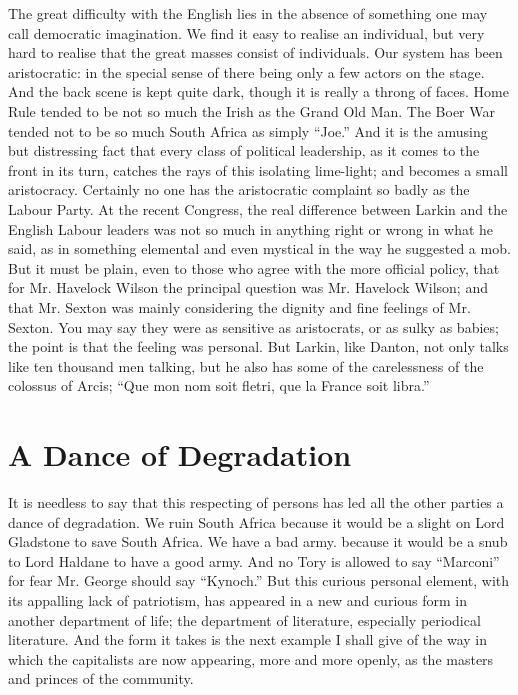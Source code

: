 \documentclass{book}
\begin{document}
The great difficulty with the English lies in the absence of something one may call democratic imagination. We find it easy to realise an individual, but very hard to realise that the great masses consist of individuals. Our system has been aristocratic: in the special sense of there being only a few actors on the stage. And the back scene is kept quite dark, though it is really a throng of faces. Home Rule tended to be not so much the Irish as the Grand Old Man. The Boer War tended not to be so much South Africa as simply “Joe.” And it is the amusing but distressing fact that every class of political leadership, as it comes to the front in its turn, catches the rays of this isolating lime-light; and becomes a small aristocracy. Certainly no one has the aristocratic complaint so badly as the Labour Party. At the recent Congress, the real difference between Larkin and the English Labour leaders was not so much in anything right or wrong in what he said, as in something elemental and even mystical in the way he suggested a mob. But it must be plain, even to those who agree with the more official policy, that for Mr. Havelock Wilson the principal question was Mr. Havelock Wilson; and that Mr. Sexton was mainly considering the dignity and fine feelings of Mr. Sexton. You may say they were as sensitive as aristocrats, or as sulky as babies; the point is that the feeling was personal. But Larkin, like Danton, not only talks like ten thousand men talking, but he also has some of the carelessness of the colossus of Arcis; “Que mon nom soit fletri, que la France soit libra.”

\section{A Dance of Degradation}
It is needless to say that this respecting of persons has led all the other parties a dance of degradation. We ruin South Africa because it would be a slight on Lord Gladstone to save South Africa. We have a bad army. because it would be a snub to Lord Haldane to have a good army. And no Tory is allowed to say “Marconi” for fear Mr. George should say “Kynoch.” But this curious personal element, with its appalling lack of patriotism, has appeared in a new and curious form in another department of life; the department of literature, especially periodical literature. And the form it takes is the next example I shall give of the way in which the capitalists are now appearing, more and more openly, as the masters and princes of the community.
\end{document}
